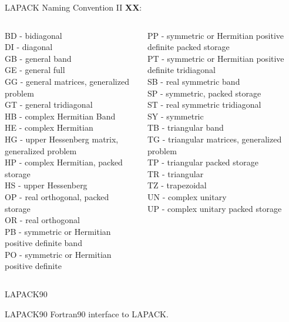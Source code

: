 	\begin{frame}{LAPACK Naming Convention II}
	\textbf{XX}: 
	\vspace{5mm}
	\begin{columns}
		\begin{column}{0.5\textwidth}
		\scriptsize
	BD - bidiagonal \\
	DI - diagonal \\
	GB - general band \\
	GE - general full \\
	GG - general matrices, generalized problem \\
	GT - general tridiagonal \\
	HB - complex Hermitian Band \\
	HE - complex Hermitian \\
	HG - upper Hessenberg matrix, generalized problem \\
	HP - complex Hermitian, packed storage \\
	HS - upper Hessenberg \\
	OP - real orthogonal, packed storage \\
	OR - real orthogonal \\
	PB - symmetric or Hermitian positive definite band \\
	PO - symmetric or Hermitian positive definite \\
	\end{column}
	\begin{column}{0.5\textwidth}
	\scriptsize
	PP - symmetric or Hermitian positive definite packed storage \\
	PT - symmetric or Hermitian positive definite tridiagonal \\
	SB - real symmetric band \\
	SP - symmetric, packed storage \\
	ST - real symmetric tridiagonal \\
	SY - symmetric \\
	TB - triangular band \\
	TG - triangular matrices, generalized problem \\
	TP - triangular packed storage \\
	TR - triangular \\
	TZ - trapezoidal \\
	UN - complex unitary \\
	UP - complex unitary packed storage \\
		\end{column}
	\end{columns}
	\end{frame}
	\begin{frame}{LAPACK90}
		\begin{block}{LAPACK90}
			Fortran90 interface to LAPACK.
		\end{block}
	\end{frame}